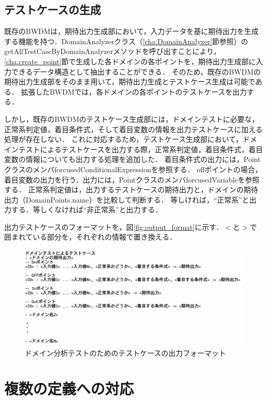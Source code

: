 \documentclass[uplatex, report, a4j, 10pt]{jsbook}
\begin{document}
\subsection{テストケースの生成}
既存のBWDMは，期待出力生成部において，入力データを基に期待出力を生成する機能を持つ．DomainAnalyzerクラス（\ref{cha:DomainAnalyzer}節参照）のgetAllTestCaseByDomainAnalyzerメソッドを呼び出すことにより，\ref{cha:create_point}節で生成した各ドメインの各ポイントを，期待出力生成部に入力できるデータ構造として抽出することができる．
そのため，既存のBWDMの期待出力生成部をそのまま用いて，期待出力生成とテストケース生成は可能である．
拡張したBWDMでは，各ドメインの各ポイントのテストケースを出力する．

しかし，既存のBWDMのテストケース生成部には，ドメインテストに必要な，正常系判定値，着目条件式，そして着目変数の情報を出力テストケースに加える処理が存在しない．
これに対応するため，テストケース生成部において，ドメインテストによるテストケースを出力する際，正常系判定値，着目条件式，着目変数の情報についても出力する処理を追加した．
着目条件式の出力には，PointクラスのメンバforcusedConditionalExpressionを参照する．
offポイントの場合，着目変数の出力を行う．出力には，PointクラスのメンバforcusedVariableを参照する．
正常系判定値は，出力するテストケースの期待出力と，ドメインの期待出力（DomainPoints.name）を比較して判断する．
等しければ，“正常系”と出力する．等しくなければ“非正常系”と出力する．

出力テストケースのフォーマットを，図\ref{fig:output_format}に示す．$<$と$>$で囲まれている部分を，それぞれの情報で置き換える．

\begin{figure}[tp]
  \centering
  \includegraphics[keepaspectratio, width=160mm]{figs/dmin_output_format}
  \caption{ドメイン分析テストのためのテストケースの出力フォーマット}
  \label{fig:dmin_output_format}
\end{figure}

\section{複数の定義への対応}
\end{document}
